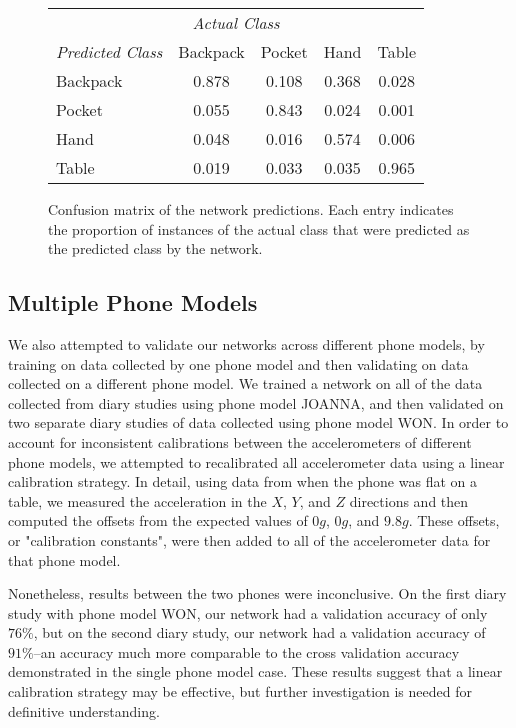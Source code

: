  \begin{figure}[t]
 \center
\begin{tabular}{| l || c | c | c | c |}  
\toprule
\multicolumn{5}{c}{\textit{Actual Class}} \\ \cmidrule{2-5}
\textit{Predicted Class}		&	Backpack    & 	Pocket 	& 	Hand	&	Table \\
\midrule
Backpack			&	0.878 	&	0.108	&	0.368 	&	0.028 \\
Pocket			&	0.055 	&	0.843 	&	0.024 	&	0.001 \\
Hand			&	0.048 	&	0.016 	&	0.574 	&	0.006 \\
Table			&	0.019 	&	0.033 	&	0.035 	&	0.965\\
\bottomrule
\end{tabular}

\caption{Confusion matrix of the network predictions. Each entry indicates the proportion of
instances of the actual class that were predicted as the predicted class by the network.}
\centering
\label{fig:confusion}
\end{figure}  


\subsection{Multiple Phone Models}
We also attempted to validate our networks across different phone models, by training
on data collected by one phone model and then validating on data collected on a 
different phone model. We trained a network on all of the 
data collected from diary studies using phone model JOANNA, and then validated on 
two separate diary studies of data collected using phone model WON. In order to account
for inconsistent calibrations between the accelerometers of different phone models, we
attempted to recalibrated all accelerometer data using a linear calibration strategy. In detail,
using data from when the phone was flat on a table, we measured the acceleration in the
$X$, $Y$, and $Z$ directions and then computed the offsets from the expected values of
$0g$, $0g$, and $9.8g$. These offsets, or "calibration constants", were then added to 
all of the accelerometer data for that phone model.

Nonetheless, results between the two phones were inconclusive. On the first diary study with phone model WON, our network
had a validation accuracy of only $76\%$, but on the second diary study, our network had a validation
accuracy of $91\%$--an accuracy much more comparable to the cross validation accuracy
demonstrated in the single phone model case. These results suggest that a linear calibration
strategy may be effective, but further investigation is needed for definitive understanding.
